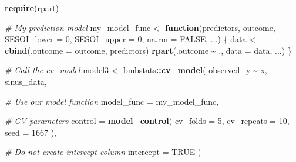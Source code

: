 \documentclass[
]{book}
\newenvironment{Shaded}{\begin{snugshade}}{\end{snugshade}}
\newcommand{\CommentTok}[1]{\textcolor[rgb]{0.56,0.35,0.01}{\textit{#1}}}
\newcommand{\ControlFlowTok}[1]{\textcolor[rgb]{0.13,0.29,0.53}{\textbf{#1}}}
\newcommand{\DataTypeTok}[1]{\textcolor[rgb]{0.13,0.29,0.53}{#1}}
\newcommand{\DecValTok}[1]{\textcolor[rgb]{0.00,0.00,0.81}{#1}}
\newcommand{\KeywordTok}[1]{\textcolor[rgb]{0.13,0.29,0.53}{\textbf{#1}}}
\newcommand{\NormalTok}[1]{#1}
\newcommand{\OperatorTok}[1]{\textcolor[rgb]{0.81,0.36,0.00}{\textbf{#1}}}
\newcommand{\OtherTok}[1]{\textcolor[rgb]{0.56,0.35,0.01}{#1}}
\newcommand{\StringTok}[1]{\textcolor[rgb]{0.31,0.60,0.02}{#1}}
\begin{document}
\begin{Shaded}
\begin{Highlighting}[]
\KeywordTok{require}\NormalTok{(rpart)}

\CommentTok{\# My prediction model}
\NormalTok{my\_model\_func <{-}}\StringTok{ }\ControlFlowTok{function}\NormalTok{(predictors,}
\NormalTok{                          outcome,}
                          \DataTypeTok{SESOI\_lower =} \DecValTok{0}\NormalTok{,}
                          \DataTypeTok{SESOI\_upper =} \DecValTok{0}\NormalTok{,}
                          \DataTypeTok{na.rm =} \OtherTok{FALSE}\NormalTok{,}
\NormalTok{                          ...) \{}
\NormalTok{  data <{-}}\StringTok{ }\KeywordTok{cbind}\NormalTok{(}\DataTypeTok{.outcome =}\NormalTok{ outcome, predictors)}
  \KeywordTok{rpart}\NormalTok{(.outcome }\OperatorTok{\textasciitilde{}}\StringTok{ }\NormalTok{., }\DataTypeTok{data =}\NormalTok{ data, ...)}
\NormalTok{\}}

\CommentTok{\# Call the cv\_model}
\NormalTok{model3 <{-}}\StringTok{ }\NormalTok{bmbstats}\OperatorTok{::}\KeywordTok{cv\_model}\NormalTok{(}
\NormalTok{  observed\_y }\OperatorTok{\textasciitilde{}}\StringTok{ }\NormalTok{x,}
\NormalTok{  sinus\_data,}

  \CommentTok{\# Use our model function}
  \DataTypeTok{model\_func =}\NormalTok{ my\_model\_func,}

  \CommentTok{\# CV parameters}
  \DataTypeTok{control =} \KeywordTok{model\_control}\NormalTok{(}
    \DataTypeTok{cv\_folds =} \DecValTok{5}\NormalTok{,}
    \DataTypeTok{cv\_repeats =} \DecValTok{10}\NormalTok{,}
    \DataTypeTok{seed =} \DecValTok{1667}
\NormalTok{  ),}

  \CommentTok{\# Do not create intercept column}
  \DataTypeTok{intercept =} \OtherTok{TRUE}
\NormalTok{)}


\end{Highlighting}
\end{Shaded}
\end{document}
